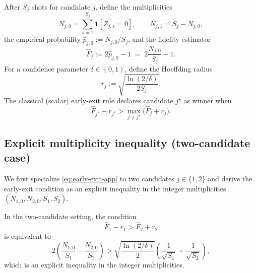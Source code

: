 \documentclass[11pt]{article}
\begin{document}
After \(S_j\) shots for candidate \(j\), define the multiplicities
\begin{equation}
  N_{j,0} = \sum_{s=1}^{S_j} \mathbf{1}[Z_{j,s}=0],
  \qquad
  N_{j,1} = S_j - N_{j,0},
\end{equation}
the empirical probability
\(\hat{p}_{j,0} := N_{j,0}/S_j\),
and the fidelity estimator
\begin{equation}
  \hat{F}_j
  :=
  2\hat{p}_{j,0} - 1
  \;=\;
  2\frac{N_{j,0}}{S_j} - 1.
\end{equation}
For a confidence parameter \(\delta \in (0,1)\), define the
Hoeffding radius
\begin{equation}
  r_j
  :=
  \sqrt{\frac{\ln(2/\delta)}{2 S_j}}.
\end{equation}
The classical (scalar) early-exit rule declares candidate \(j^\star\) as
winner when
\begin{equation}
  \hat{F}_{j^\star} - r_{j^\star}
  >
  \max_{j\neq j^\star} \bigl(\hat{F}_j + r_j\bigr).
  \label{eq:early-exit-app}
\end{equation}

\subsection{Explicit multiplicity inequality (two-candidate case)}
\label{app:two-candidate}

We first specialize \eqref{eq:early-exit-app} to two candidates
\(j\in\{1,2\}\) and derive the early-exit condition as an explicit
inequality in the integer multiplicities
\((N_{1,0},N_{2,0},S_1,S_2)\).

\begin{lemma}
\label{lem:mult-ineq-two}
In the two-candidate setting, the condition
\begin{equation}
  \hat{F}_1 - r_1 > \hat{F}_2 + r_2
\end{equation}
is equivalent to
\begin{equation}
  2\left(\frac{N_{1,0}}{S_1} - \frac{N_{2,0}}{S_2}\right)
  >
  \sqrt{\frac{\ln(2/\delta)}{2}}
  \left(
    \frac{1}{\sqrt{S_1}}
    +
    \frac{1}{\sqrt{S_2}}
  \right),
  \label{eq:mult-ineq-two}
\end{equation}
which is an explicit inequality in the integer multiplicities.
\end{lemma}
\end{document}
